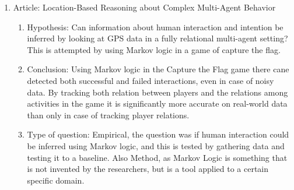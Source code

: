 \documentclass{article}
\begin{document}
\begin{enumerate}
{\begin{enumerate}
{\begin{enumerate}
            \item Conclusion: By creating a new fitness evaluation function for scheduling the performance of the scheduler improves, creating more compact and robust schedules compared to existing methods. This new model does not work in case there is a covariance in the duration uncertainties between items to be scheduled. This however, can occur in real life scheduling problems and still needs to be worked on.
            \item Type of question: Empirical; Their algorithm is tested next to a bunch of other algorithms, to show how well their own results are when comparing them to other research in the same domain.
            \item Type of research: creating an algorithm and testing this on the specific domain of scheduling.
        \end{enumerate}
        }
        \item {Article: Location-Based Reasoning about Complex Multi-Agent Behavior
        \begin{enumerate}
            \item Hypothesis: Can information about human interaction and intention be inferred by looking at GPS data in a fully relational multi-agent setting? This is attempted by using Markov logic in a game of capture the flag.
            \item Conclusion: Using Markov logic in the Capture the Flag game there cane detected both successful and failed interactions, even in case of noisy data. By tracking both relation between players and the relations among activities in the game it is significantly more accurate on real-world data than only in case of tracking player relations.
            \item Type of question: Empirical, the question was if human interaction could be inferred using Markov logic, and this is tested by gathering data and testing it to a baseline. Also Method, as Markov Logic is something that is not invented by the researchers, but is a tool applied to a certain specific domain.
            

\end{enumerate}}
\end{enumerate}}
\end{enumerate}
\end{document}
